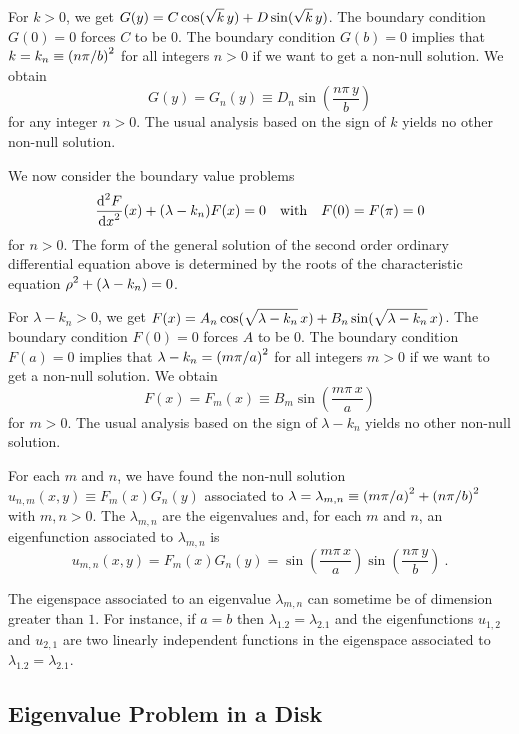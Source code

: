 For $k>0$, we get
$\displaystyle G(y) = C \cos(\sqrt{k}\,y) + D \sin(\sqrt{k} \,y)$.
The boundary condition $G(0)=0$ forces $C$ to be $0$.  The boundary
condition $G(b) = 0$ implies that
$\displaystyle k = k_n \equiv \left(n\pi/b\right)^2$ for all integers $n>0$
if we want to get a non-null solution.
We obtain
\[
G(y) = G_n(y) \equiv D_n \sin\left( \frac{n\pi\, y}{b}\right)
\]
for any integer $n>0$.  The usual analysis based on the sign of
$k$ yields no other non-null solution.

We now consider the boundary value problems
\begin{equation} \label{laplace_e_eigenC3}
\frac{\displaystyle \mathrm{d}^{2}{F}} {\displaystyle \mathrm{d}{x}^{2}}(x) + (\lambda-k_n) F(x) = 0 \quad \text{with}
\quad F(0)=F(\pi)=0
\end{equation}
for $n>0$.  The form of the general solution
of the second order ordinary differential equation above is determined by the roots of the
characteristic equation $\displaystyle \rho^2 +(\lambda-k_n)=0$.

For $\lambda-k_n>0$, we get
$\displaystyle F(x) = A_n \cos(\sqrt{\lambda-k_n}\, x) + B_n
\sin(\sqrt{\lambda-k_n}\,x)$.
The boundary condition $F(0)=0$ forces $A$ to be $0$.  The boundary
condition $F(a) = 0$ implies that
$\displaystyle \lambda - k_n = \left(m\pi/a\right)^2$ for
all integers $m>0$ if we want to get a non-null solution.  We obtain
\[
F(x) = F_m(x) \equiv B_m \sin\left(\frac{m\pi\,x}{a}\right)
\]
for $m>0$.  The usual analysis based on the sign of
$\lambda - k_n$ yields no other non-null solution.

For each $m$ and $n$, we have found the non-null solution
$u_{n,m}(x,y) \equiv F_m(x)G_n(y)$ associated to
$\displaystyle \lambda = \lambda_{m,n} \equiv \left(m\pi/a\right)^2 +
\left(n\pi/b\right)^2$ with $m,n > 0$.  The $\lambda_{m,n}$
are the eigenvalues and, for each $m$ and $n$, an eigenfunction
associated to $\lambda_{m,n}$ is
\[
u_{m,n}(x,y) = F_m(x)G_n(y) = \sin\left(\frac{m\pi\,x}{a}\right)
\sin\left( \frac{n\pi\, y}{b}\right) \ .
\]

\begin{rmk}
The eigenspace associated to an eigenvalue $\lambda_{m,n}$ can
sometime be of dimension greater than $1$.  For instance, if $a=b$
then $\lambda_{1.2} = \lambda_{2.1}$ and the eigenfunctions
$u_{1,2}$ and $u_{2,1}$ are two linearly independent functions in the
eigenspace associated to $\lambda_{1.2} = \lambda_{2.1}$.
\end{rmk}

\subsection{Eigenvalue Problem in a Disk}

